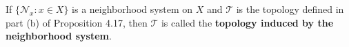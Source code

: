 If $\{\mathcal{N}_x : x \in X\}$ is a neighborhood system on $X$ and $\mathcal{T}$ is the topology defined in part (b) of Proposition 4.17, then $\mathcal{T}$ is called the \textbf{topology induced by the neighborhood system}.
